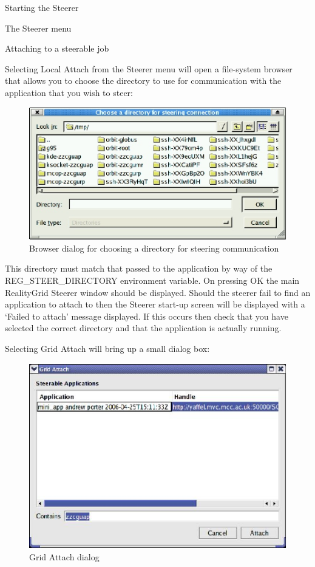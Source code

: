 \documentclass[a4paper,twoside]{article}
\begin{document}
\begin{section}{Starting the Steerer}
\begin{subsection}{The Steerer menu}
\end{subsection}

\begin{subsection}{Attaching to a steerable job}

Selecting Local Attach from the Steerer menu will open a file-system
browser that allows you to choose the directory to use for
communication with the application that you wish to steer:

\begin{figure}
\centerline{\includegraphics{dir_browser.eps}}
\caption{Browser dialog for choosing a directory for steering communication}
\label{fig:dir_browser}
\end{figure}

This directory must match that passed to the application by way of the
REG\_STEER\_DIRECTORY environment variable.  On pressing OK the main
RealityGrid Steerer window should be displayed.  Should the steerer
fail to find an application to attach to then the Steerer start-up
screen will be displayed with a `Failed to attach' message displayed.
If this occurs then check that you have selected the correct directory
and that the application is actually running.

Selecting Grid Attach will bring up a small dialog box:

\begin{figure}
\centerline{\includegraphics{grid_attach.eps}}
\caption{Grid Attach dialog}
\label{fig:grid_attach}
\end{figure}


\end{subsection}
\end{section}
\end{document}
